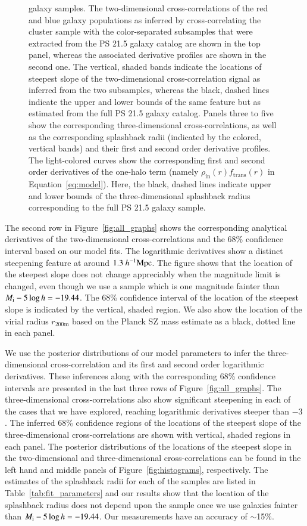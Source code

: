 \documentclass[iop, apjl, twocolappendix, numberedappendix]{emulateapj}
\def\mpch{h^{-1}{\rm Mpc}}
\begin{document}
\begin{figure}
{galaxy samples. The two-dimensional cross-correlations
of the red and blue galaxy populations as inferred by
cross-correlating the cluster sample with the color-separated
subsamples that were extracted from the PS 21.5 galaxy catalog are
shown in the top panel, whereas the associated derivative profiles
are shown in the second one. The vertical, shaded bands indicate the
locations of steepest slope of the two-dimensional cross-correlation signal 
as inferred from the two subsamples, whereas the black, dashed lines
indicate the upper and lower bounds of the same feature but as
estimated from the full PS 21.5 galaxy catalog.
Panels three to five show the corresponding three-dimensional 
cross-correlations, as well as the corresponding
splashback radii (indicated by the colored, vertical bands) and
their first and second order derivative profiles. The light-colored 
curves show the corresponding first and second order derivatives of the one-halo
term (namely $\rho_{\mathrm{in}}(r)f_{\mathrm{trans}}(r)$ in Equation~\ref{eq:model}). Here, the black, dashed lines indicate upper and lower bounds of the 
three-dimensional splashback radius corresponding to the full PS 21.5 galaxy sample.}
   \label{fig:color_curve_all} 
\end{figure}

The second row in Figure~\ref{fig:all_graphs} shows the
corresponding analytical derivatives of the two-dimensional
cross-correlations and the 68\% confidence interval based on our
model fits. The logarithmic derivatives show a distinct steepening
feature at around $1.3~\mpch$. The figure shows that the
location of the steepest slope does not change appreciably when the
magnitude limit is changed, even though we use a sample which is one
magnitude fainter than $M_{\rm i}-5\log h=-19.44$. The 68\%
confidence interval of the location of the steepest slope is
indicated by the vertical, shaded region. We also show the location
of the virial radius $r_{\mathrm{200m}}$ based on the Planck SZ mass estimate 
as a black, dotted line in each panel.

We use the posterior distributions of our model parameters to infer
the three-dimensional cross-correlation and its first and second order logarithmic
derivatives. These inferences along with the corresponding 68\%
confidence intervals are presented in the last three rows of 
Figure~\ref{fig:all_graphs}. The three-dimensional cross-correlations
also show significant steepening in each of the cases that we have
explored, reaching logarithmic derivatives steeper than $-3$. The
inferred 68\% confidence regions of the locations of the steepest
slope of the three-dimensional cross-correlations are shown with
vertical, shaded regions in each panel. The posterior
distributions of the locations of the steepest slope in the
two-dimensional and three-dimensional cross-correlations can be
found in the left hand and middle panels of
Figure~\ref{fig:histograms}, respectively. The estimates of the splashback radii
for each of the samples are listed in Table~\ref{tab:fit_parameters}
and our results show that the location of the splashback radius does
not depend upon the sample once we use galaxies fainter than $M_{\rm
i}-5\log h=-19.44$. Our measurements have an accuracy of $\sim$15\%.
\end{document}
